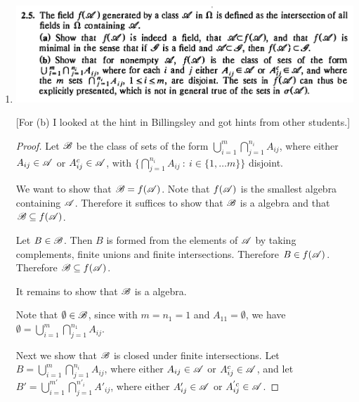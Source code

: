 \begin{enumerate}
\begin{enumerate}[label=(\alph*)]
    \begin{claim*}
      $f(\ms A)$ is minimal in the sense that if $\ms G$ is an algebra and $\ms A \subset \ms G$, then $f(\ms A) \subset \ms G$.
    \end{claim*}
    \begin{proof}
      If $\ms G$ is an algebra with $\ms A \subset \ms G$ then $\ms G \in \{\ms F_1, \ms F_2, \ldots\}$, therefore $\ms G \supset \bigcap_{n}\ms F_n = f(\ms A)$.
    \end{proof}

  \item
    \includegraphics[width=400pt]{img/analysis--berkeley-202a-hw-ab18.png}

    [For (b) I looked at the hint in Billingsley and got hints from other students.]

    \begin{proof}
      Let $\mathscr B$ be the class of sets of the form $\bigcup_{i=1}^m \bigcap_{j=1}^{n_i} A_{ij}$, where
      either $A_{ij} \in \mathscr A$ or $A^c_{ij} \in \mathscr A$,
      with $\big\{\bigcap_{j=1}^{n_i} A_{ij} ~ : ~ i \in \{1, \ldots m\}\big\}$ disjoint.

      We want to show that $\mathscr B = f(\mathscr A)$. Note that $f(\ms A)$ is the smallest algebra containing $\mathscr A$.
      Therefore it suffices to show that $\mathscr B$ is a algebra and that $\mathscr B \subseteq f(\mathscr A)$.

      Let $B \in \mathscr B$. Then $B$ is formed from the elements of $\mathscr A$ by taking complements, finite unions
      and finite intersections. Therefore $B \in f(\mathscr A)$. Therefore $\mathscr B \subseteq f(\mathscr A)$.

      It remains to show that $\mathscr B$ is a algebra.

      Note that $\emptyset \in \mathscr B$, since with $m = n_1 = 1$ and $A_{11} = \emptyset$, we
      have $\emptyset = \bigcup_{i=1}^m\bigcap_{j=1}^{n_1}A_{ij}$.

      Next we show that $\mathscr B$ is closed under finite intersections.
      Let $B = \bigcup_{i=1}^m \bigcap_{j=1}^{n_i} A_{ij}$, where either $A_{ij} \in \mathscr A$
      or $A^c_{ij} \in \mathscr A$, and let $B' = \bigcup_{i=1}^{m'} \bigcap_{j=1}^{n'_i} A'_{ij}$, where
      either $A'_{ij} \in \mathscr A$ or $A^{'c}_{ij} \in \mathscr A$.


\end{proof}
\end{enumerate}
\end{enumerate}
